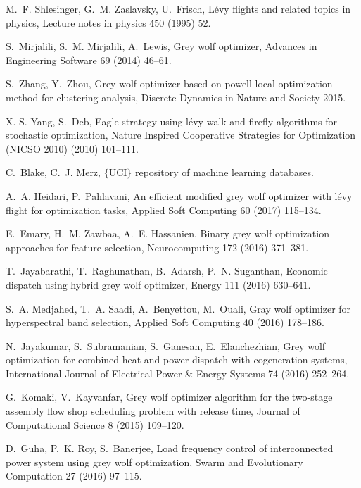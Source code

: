 \documentclass[review]{elsarticle}
\begin{document}
\begin{thebibliography}{10}
M.~F. Shlesinger, G.~M. Zaslavsky, U.~Frisch, L{\'e}vy flights and related
  topics in physics, Lecture notes in physics 450 (1995) 52.

S.~Mirjalili, S.~M. Mirjalili, A.~Lewis, Grey wolf optimizer, Advances in
  Engineering Software 69 (2014) 46--61.


S.~Zhang, Y.~Zhou, Grey wolf optimizer based on powell local optimization
  method for clustering analysis, Discrete Dynamics in Nature and Society 2015.

X.-S. Yang, S.~Deb, Eagle strategy using l{\'e}vy walk and firefly algorithms
  for stochastic optimization, Nature Inspired Cooperative Strategies for
  Optimization (NICSO 2010) (2010) 101--111.

C.~Blake, C.~J. Merz, $\{$UCI$\}$ repository of machine learning databases.

A.~A. Heidari, P.~Pahlavani, An efficient modified grey wolf optimizer with
  l{\'e}vy flight for optimization tasks, Applied Soft Computing 60 (2017)
  115--134.





E.~Emary, H.~M. Zawbaa, A.~E. Hassanien, Binary grey wolf optimization
  approaches for feature selection, Neurocomputing 172 (2016) 371--381.

T.~Jayabarathi, T.~Raghunathan, B.~Adarsh, P.~N. Suganthan, Economic dispatch
  using hybrid grey wolf optimizer, Energy 111 (2016) 630--641.

S.~A. Medjahed, T.~A. Saadi, A.~Benyettou, M.~Ouali, Gray wolf optimizer for
  hyperspectral band selection, Applied Soft Computing 40 (2016) 178--186.

N.~Jayakumar, S.~Subramanian, S.~Ganesan, E.~Elanchezhian, Grey wolf
  optimization for combined heat and power dispatch with cogeneration systems,
  International Journal of Electrical Power \& Energy Systems 74 (2016)
  252--264.

G.~Komaki, V.~Kayvanfar, Grey wolf optimizer algorithm for the two-stage
  assembly flow shop scheduling problem with release time, Journal of
  Computational Science 8 (2015) 109--120.

D.~Guha, P.~K. Roy, S.~Banerjee, Load frequency control of interconnected power
  system using grey wolf optimization, Swarm and Evolutionary Computation 27
  (2016) 97--115.


\end{thebibliography}
\end{document}
